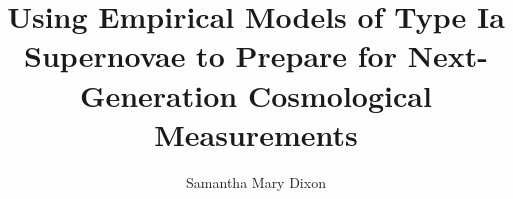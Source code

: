 \documentclass{ucbthesis}
\begin{document}

\title{Using Empirical Models of Type Ia Supernovae to Prepare for Next-Generation Cosmological Measurements}
\author{Samantha Mary Dixon}


\maketitle
\copyrightpage



\begin{frontmatter}



\tableofcontents
\clearpage
\listoffigures
\clearpage
\listoftables

\end{frontmatter}

\pagestyle{headings}











\appendix





\end{document}
